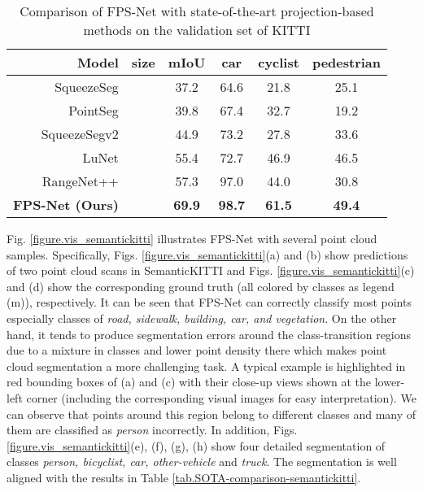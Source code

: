 \documentclass[preprint,review,3p]{elsarticle}
\begin{document}
\renewcommand\arraystretch{1.2}
\begin{table}[t]
  \caption{Comparison of FPS-Net with state-of-the-art projection-based methods on the validation set of KITTI}
  \centering
  \begin{tabular}{r|c|c|ccc}
    \hline
    Model & size & mIoU & car & cyclist & pedestrian \\
    \hline
    SqueezeSeg\cite{wu2018squeezeseg} &  & 37.2 & 64.6 & 21.8 & 25.1 \\
    PointSeg \cite{wang2018pointseg} &  & 39.8 & 67.4 & 32.7 & 19.2\\
    SqueezeSegv2\cite{wu2019squeezesegv2} &  & 44.9 & 73.2 & 27.8 & 33.6 \\
    LuNet\cite{biasutti2019lunet} &  & 55.4 & 72.7 & 46.9 & 46.5 \\
    RangeNet++\cite{milioto2019rangenet++} &  & 57.3 & 97.0 & 44.0 & 30.8 \\
    \hline
   \textbf{FPS-Net (Ours)} &  & \textbf{69.9} & \textbf{98.7} & \textbf{61.5} & \textbf{49.4} \\
    \hline
  \end{tabular}
  \label{tab.SOTA-comparison-kitti}
\end{table}



Fig. \ref{figure.vis_semantickitti} illustrates FPS-Net with several point cloud samples. Specifically, Figs. \ref{figure.vis_semantickitti}(a) and (b) show predictions of two point cloud scans in SemanticKITTI and Figs. \ref{figure.vis_semantickitti}(c) and (d) show the corresponding ground truth (all colored by classes as legend (m)), respectively. It can be seen that FPS-Net can correctly classify most points especially classes of \textit{road, sidewalk, building, car, and vegetation}. On the other hand, it tends to produce segmentation errors around the class-transition regions due to a mixture in classes and lower point density there which makes point cloud segmentation a more challenging task. A typical example is highlighted in red bounding boxes of (a) and (c) with their close-up views shown at the lower-left corner (including the corresponding visual images for easy interpretation). We can observe that points around this region belong to different classes and many of them are classified as \textit{person} incorrectly. In addition, Figs. \ref{figure.vis_semantickitti}(e), (f), (g), (h) show four detailed segmentation of classes \textit{person, bicyclist, car, other-vehicle} and \textit{truck}. The segmentation is well aligned with the results in Table \ref{tab.SOTA-comparison-semantickitti}.
\end{document}
